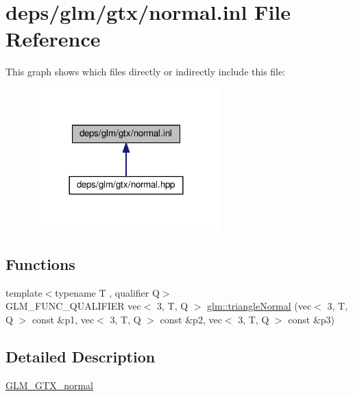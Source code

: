\hypertarget{normal_8inl}{}\section{deps/glm/gtx/normal.inl File Reference}
\label{normal_8inl}
This graph shows which files directly or indirectly include this file\+:
\nopagebreak
\begin{figure}[H]
\begin{center}
\leavevmode
\includegraphics[width=204pt]{d2/d81/normal_8inl__dep__incl}
\end{center}
\end{figure}
\subsection*{Functions}
\begin{DoxyCompactItemize}
\item 
{\footnotesize template$<$typename T , qualifier Q$>$ }\\G\+L\+M\+\_\+\+F\+U\+N\+C\+\_\+\+Q\+U\+A\+L\+I\+F\+I\+ER vec$<$ 3, T, Q $>$ \hyperlink{group__gtx__normal_gaff1cb5496925dfa7962df457772a7f35}{glm\+::triangle\+Normal} (vec$<$ 3, T, Q $>$ const \&p1, vec$<$ 3, T, Q $>$ const \&p2, vec$<$ 3, T, Q $>$ const \&p3)
\end{DoxyCompactItemize}


\subsection{Detailed Description}
\hyperlink{group__gtx__normal}{G\+L\+M\+\_\+\+G\+T\+X\+\_\+normal} 